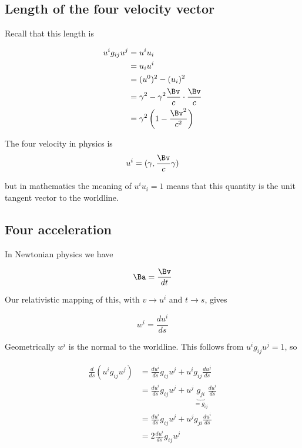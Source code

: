 \subsection{Length of the four velocity vector}

Recall that this length is

\begin{align*}
u^i g_{ij} u^j 
&= u^i u_i  \\
&= u_i u^i  \\
&= (u^0)^2 - (u_i)^2 \\
&= \gamma^2 - \gamma^2 \frac{\Bv}{c} \cdot \frac{\Bv}{c} \\
&= \gamma^2 \left(1 - \frac{\Bv^2}{c^2} \right)
\end{align*}

The four velocity in physics is
\begin{equation}\label{eqn:relativisticElectrodynamicsL7:110}
u^i = ( \gamma, \frac{\Bv}{c} \gamma )
\end{equation}

but in mathematics the meaning of $u^i u_i = 1$ means that this quantity is the unit tangent vector to the worldline.

\subsection{Four acceleration}

In Newtonian physics we have 

\begin{equation}\label{eqn:relativisticElectrodynamicsL7:111}
\Ba = \frac{\Bv}{dt}
\end{equation}

Our relativistic mapping of this, with $v \rightarrow u^i$ and $t \rightarrow s$, gives

\begin{equation}\label{eqn:relativisticElectrodynamicsL7:120}
w^i = \frac{d u^i}{ds}
\end{equation}

Geometrically $w^i$ is the normal to the worldline.  This follows from $u^i g_{ij} u^j = 1$, so

\begin{align*}
\frac{d}{ds} \left( u^i g_{ij} u^j \right) 
&=
\frac{d u^i}{ds} g_{ij} u^j 
+u^i g_{ij} \frac{d u^j}{ds} \\
&=
\frac{d u^i}{ds} g_{ij} u^j 
+u^j \underbrace{g_{ji}}_{= g_{ij}} \frac{d u^i}{ds} \\
&=
\frac{d u^i}{ds} g_{ij} u^j 
+u^j g_{ji} \frac{d u^i}{ds} \\
&=
2 \frac{d u^i}{ds} g_{ij} u^j 
\end{align*}

